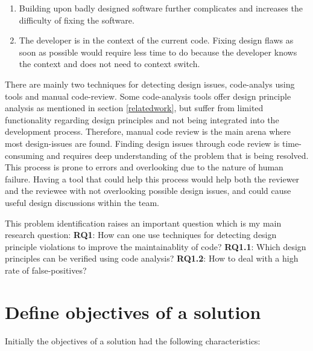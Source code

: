 \documentclass{report}
\begin{document}
\begin{enumerate}
    \item Building upon badly designed software further complicates and increases the difficulty of fixing the software.

    \item The developer is in the context of the current code. Fixing design flaws as soon as possible would require less time to do because the developer knows the context and does not need to context switch.

\end{enumerate}

There are mainly two techniques for detecting design issues, code-analys using tools and manual code-review. Some code-analysis tools offer design principle analysis as mentioned in section \ref{relatedwork}, but suffer from limited functionality regarding design principles and not being integrated into the development process. Therefore, manual code review is the main arena where most design-issues are found. Finding design issues through code review is time-consuming and requires deep understanding of the problem that is being resolved. This process is prone to errors and overlooking due to the nature of human failure. Having a tool that could help this process would help both the reviewer and the reviewee with not overlooking possible design issues, and could cause useful design discussions within the team.

\hfill \newline
This problem identification raises an important question which is my main research question:
\hfill \newline
\hfill \newline
\textbf{RQ1}: How can one use techniques for detecting design principle violations to improve the maintainablity of code? \newline
\textbf{RQ1.1}: Which design principles can be verified using code analysis? \newline
\textbf{RQ1.2}: How to deal with a high rate of false-positives? 


\section{Define objectives of a solution}
\label{objectives-of-solution}



Initially the objectives of a solution had the following characteristics:
\end{document}
